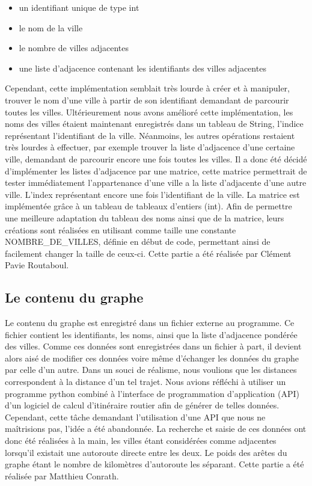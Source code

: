 \documentclass[a4paper, 12pt]{article}
\begin{document}
        \begin{itemize}
            \item un identifiant unique de type int
            \item le nom de la ville
            \item le nombre de villes adjacentes
            \item une liste d'adjacence contenant les identifiants des villes adjacentes
        \end{itemize}
        Cependant, cette implémentation semblait très lourde à créer et à manipuler,
        trouver le nom d'une ville à partir de son identifiant demandant de parcourir toutes les villes.
        Ultérieurement nous avons amélioré cette implémentation, les noms des villes étaient maintenant enregistrés dans un tableau de String, l'indice représentant l'identifiant de la ville.
        Néanmoins, les autres opérations restaient très lourdes à effectuer, par exemple trouver la liste d'adjacence d'une certaine ville, demandant de parcourir encore une fois toutes les villes.
        Il a donc été décidé d'implémenter les listes d'adjacence par une matrice, cette matrice permettrait de tester immédiatement l'appartenance d'une ville a la liste d'adjacente d'une autre ville.
        L'index représentant encore une fois l'identifiant de la ville.
        La matrice est implémentée grâce à un tableau de tableaux d'entiers (int).
        Afin de permettre une meilleure adaptation du tableau des noms ainsi que de la matrice, leurs créations sont réalisées en utilisant comme taille une constante NOMBRE\_DE\_VILLES, définie en début de code, permettant ainsi de facilement changer la taille de ceux-ci. Cette partie a été réalisée par Clément Pavie Routaboul.
    \subsection{Le contenu du graphe}
        Le contenu du graphe est enregistré dans un fichier externe au programme.
        Ce fichier contient les identifiants, les noms, ainsi que la liste d'adjacence pondérée des villes.
        Comme ces données sont enregistrées dans un fichier à part, il devient alors aisé de modifier ces données voire même d'échanger les données du graphe par celle d'un autre.
        Dans un souci de réalisme, nous voulions que les distances correspondent à la distance d'un tel trajet.
        Nous avions réfléchi à utiliser un programme python combiné à l'interface de programmation d'application (API) d'un logiciel de calcul d'itinéraire routier afin de générer de telles données.
        Cependant, cette tâche demandant l'utilisation d'une API que nous ne maîtrisions pas, l'idée a été abandonnée.
        La recherche et saisie de ces données ont donc été réalisées à la main, les villes étant considérées comme adjacentes lorsqu'il existait une autoroute directe entre les deux.
        Le poids des arêtes du graphe étant le nombre de kilomètres d'autoroute les séparant.
        Cette partie a été réalisée par Matthieu Conrath.
        
\end{document}
